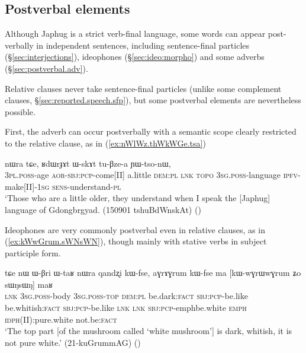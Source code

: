 \subsection{Postverbal elements} \label{sec:relative.postverbal}
Although Japhug is a strict verb-final language, some words can appear post-verbally in independent sentences, including sentence-final particles (§\ref{sec:interjections}), ideophones (§\ref{sec:ideo:morpho}) and some adverbs (§\ref{sec:postverbal.adv}).

Relative clauses never take sentence-final particles (unlike some complement clauses, §\ref{sec:reported.speech.sfp}), but some postverbal elements are nevertheless possible. 

First, the adverb  can occur postverbally with a semantic scope clearly restricted to the relative clause, as in (\ref{ex:nWlWz.thWkWGe.tsa}) 

\begin{exe}
\ex \label{ex:nWlWz.thWkWGe.tsa}
 nɯra tɕe, ʁdɯrɟɤt ɯ-skɤt tu-βze-a ɲɯ-tso-nɯ, \\
\textsc{3pl}.\textsc{poss}-age \textsc{aor}-\textsc{sbj}:\textsc{pcp}-come[II] a.little \textsc{dem}:\textsc{pl} \textsc{lnk}  \textsc{topo} \textsc{3sg}.\textsc{poss}-language \textsc{ipfv}-make[II]-\textsc{1sg} \textsc{sens}-understand-\textsc{pl} \\
\glt `Those who are a little older, they understand when I speak the [Japhug] language of Gdongbrgyad. (150901 tshuBdWnskAt)
()
\end{exe} 

Ideophones are very commonly postverbal even in relative clauses, as in (\ref{ex:kWwGrum.sWNsWN}), though mainly with stative verbs in subject participle form.

\begin{exe}
\ex \label{ex:kWwGrum.sWNsWN}
\gll tɕe nɯ ɯ-βri ɯ-taʁ nɯra qandʐi kɯ-fse, aɣrɤɣrum kɯ-fse  ma [kɯ-wɣrɯ\redp{}wɣrum ʑo sɯŋsɯŋ] maʁ \\
\textsc{lnk} \textsc{3sg}.\textsc{poss}-body \textsc{3sg}.\textsc{poss}-\textsc{top} \textsc{dem}:\textsc{pl} be.dark:\textsc{fact} \textsc{sbj}:\textsc{pcp}-be.like be.whitish:\textsc{fact} \textsc{sbj}:\textsc{pcp}-be.like \textsc{lnk} \textsc{lnk} \textsc{sbj}:\textsc{pcp}-emph\redp{}be.white \textsc{emph} \textsc{idph}(II):pure.white not.be:\textsc{fact} \\
\glt `The top part [of the mushroom called  `white mushroom'] is dark, whitish, it is not pure white.' (21-kuGrummAG)
()
\end{exe} 

